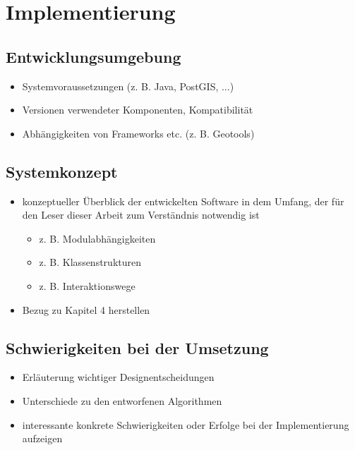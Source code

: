 \chapter{Implementierung}

\section{Entwicklungsumgebung}

\begin{itemize}
	\item Systemvoraussetzungen (z. B. Java, PostGIS, ...)
	\item Versionen verwendeter Komponenten, Kompatibilität
	\item Abhängigkeiten von Frameworks etc. (z. B. Geotools)
\end{itemize}

\section{Systemkonzept}

\begin{itemize}
	\item konzeptueller Überblick der entwickelten Software in dem Umfang, der für den Leser dieser Arbeit zum Verständnis notwendig ist
	\begin{itemize}
		\item z. B. Modulabhängigkeiten
		\item z. B. Klassenstrukturen
		\item z. B. Interaktionswege
	\end{itemize}
	\item Bezug zu Kapitel 4 herstellen
\end{itemize}

\section{Schwierigkeiten bei der Umsetzung}

\begin{itemize}
	\item Erläuterung wichtiger Designentscheidungen
	\item Unterschiede zu den entworfenen Algorithmen
	\item interessante konkrete Schwierigkeiten oder Erfolge bei der Implementierung aufzeigen
\end{itemize}

